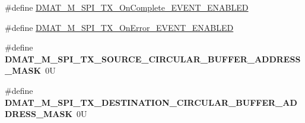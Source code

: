 \begin{DoxyCompactItemize}
\item 
\#define \hyperlink{group___d_m_a_t___m___s_p_i___t_x__module_ga2a1147576e66a9cf5af871e6b9f14d96}{D\-M\-A\-T\-\_\-\-M\-\_\-\-S\-P\-I\-\_\-\-T\-X\-\_\-\-On\-Complete\-\_\-\-E\-V\-E\-N\-T\-\_\-\-E\-N\-A\-B\-L\-E\-D}
\item 
\#define \hyperlink{group___d_m_a_t___m___s_p_i___t_x__module_ga6200d4b173dcc870b08ecda8ea755d60}{D\-M\-A\-T\-\_\-\-M\-\_\-\-S\-P\-I\-\_\-\-T\-X\-\_\-\-On\-Error\-\_\-\-E\-V\-E\-N\-T\-\_\-\-E\-N\-A\-B\-L\-E\-D}
\item 
\hypertarget{group___d_m_a_t___m___s_p_i___t_x__module_ga122e733758e38ea0fd116bdaef2db174}{\#define {\bfseries D\-M\-A\-T\-\_\-\-M\-\_\-\-S\-P\-I\-\_\-\-T\-X\-\_\-\-S\-O\-U\-R\-C\-E\-\_\-\-C\-I\-R\-C\-U\-L\-A\-R\-\_\-\-B\-U\-F\-F\-E\-R\-\_\-\-A\-D\-D\-R\-E\-S\-S\-\_\-\-M\-A\-S\-K}~0\-U}\label{group___d_m_a_t___m___s_p_i___t_x__module_ga122e733758e38ea0fd116bdaef2db174}

\item 
\hypertarget{group___d_m_a_t___m___s_p_i___t_x__module_gac305f0067871c5b7ca8d078d34af1ff5}{\#define {\bfseries D\-M\-A\-T\-\_\-\-M\-\_\-\-S\-P\-I\-\_\-\-T\-X\-\_\-\-D\-E\-S\-T\-I\-N\-A\-T\-I\-O\-N\-\_\-\-C\-I\-R\-C\-U\-L\-A\-R\-\_\-\-B\-U\-F\-F\-E\-R\-\_\-\-A\-D\-D\-R\-E\-S\-S\-\_\-\-M\-A\-S\-K}~0\-U}\label{group___d_m_a_t___m___s_p_i___t_x__module_gac305f0067871c5b7ca8d078d34af1ff5}

\end{DoxyCompactItemize}
